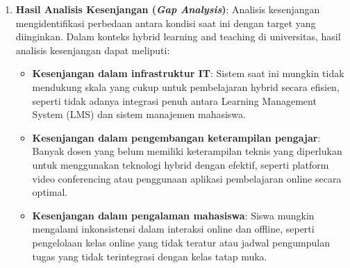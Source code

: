 \begin{enumerate}
	\item \textbf{Hasil Analisis Kesenjangan (\textit{Gap Analysis})}:  
	Analisis kesenjangan mengidentifikasi perbedaan antara kondisi saat ini dengan target yang diinginkan. Dalam konteks hybrid learning and teaching di universitas, hasil analisis kesenjangan dapat meliputi:
	\begin{itemize}
		\item \textbf{Kesenjangan dalam infrastruktur IT}: Sistem saat ini mungkin tidak mendukung skala yang cukup untuk pembelajaran hybrid secara efisien, seperti tidak adanya integrasi penuh antara Learning Management System (LMS) dan sistem manajemen mahasiswa.
		\item \textbf{Kesenjangan dalam pengembangan keterampilan pengajar}: Banyak dosen yang belum memiliki keterampilan teknis yang diperlukan untuk menggunakan teknologi hybrid dengan efektif, seperti platform video conferencing atau penggunaan aplikasi pembelajaran online secara optimal.
		\item \textbf{Kesenjangan dalam pengalaman mahasiswa}: Siswa mungkin mengalami inkonsistensi dalam interaksi online dan offline, seperti pengelolaan kelas online yang tidak teratur atau jadwal pengumpulan tugas yang tidak terintegrasi dengan kelas tatap muka.
	\end{itemize}
	

\end{enumerate}
